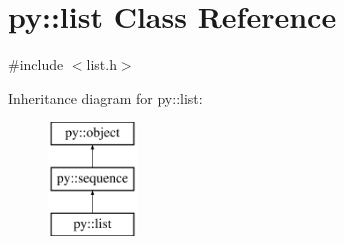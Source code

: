 \hypertarget{classpy_1_1list}{}\section{py\+:\+:list Class Reference}
\label{classpy_1_1list}


{\ttfamily \#include $<$list.\+h$>$}

Inheritance diagram for py\+:\+:list\+:\begin{figure}[H]
\begin{center}
\leavevmode
\includegraphics[height=3.000000cm]{classpy_1_1list}
\end{center}
\end{figure}
